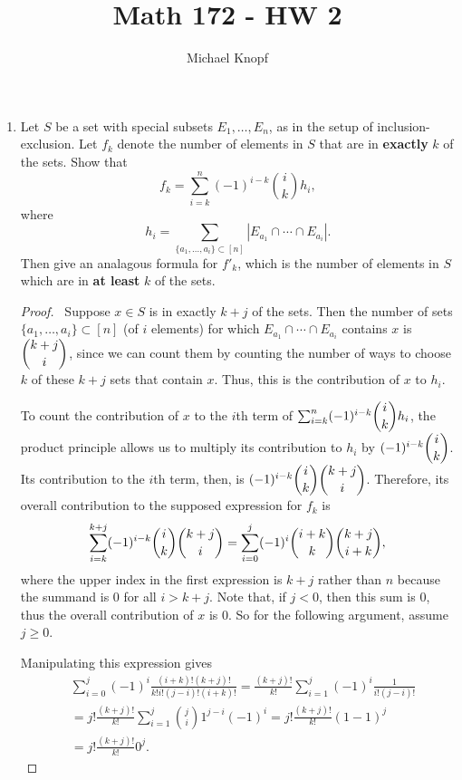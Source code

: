 \documentclass[12pt]{article}
\begin{document}
 


\title{Math 172 - HW 2}
\author{Michael Knopf}
 
\maketitle


\begin{enumerate}[leftmargin=0cm,itemindent=.5cm,labelwidth=\itemindent,labelsep=0cm,align=left]
\item Let $S$ be a set with special subsets $E_1, \dots , E_n$, as in the setup of inclusion-exclusion.  Let $f_k$ denote the number of elements in $S$ that are in \textbf{exactly} $k$ of the sets.  Show that $$f_k = \sum_{i=k}^n (-1)^{i-k} \binom{i}{k} h_i,$$ where $$h_i = \sum_{\{a_1, \dots , a_i \} \subset [n]} |E_{a_1} \cap \cdots \cap E_{a_i}|.$$  Then give an analagous formula for $f'_k$, which is the number of elements in $S$ which are in \textbf{at least} $k$ of the sets.

\begin{proof}

\ Suppose $x \in S$ is in exactly $k+j$ of the sets.  Then the number of sets $\{a_1, \dots, a_i\} \subset [n]$ (of $i$ elements) for which $E_{a_1} \cap \cdots \cap E_{a_i}$ contains $x$ is $\dbinom{k+j}{i}$, since we can count them by counting the number of ways to choose $k$ of these $k+j$ sets that contain $x$.  Thus, this is the contribution of $x$ to $h_i$.

To count the contribution of $x$ to the $i$th term of $\sum_{i=k}^n (-1)^{i-k} \dbinom{i}{k} h_i$, the product principle allows us to multiply its contribution to $h_i$ by $(-1)^{i-k}\dbinom{i}{k}$.  Its contribution to the $i$th term, then, is $(-1)^{i-k}\dbinom{i}{k}\dbinom{k+j}{i}$.  Therefore, its overall contribution to the supposed expression for $f_k$ is $$\sum_{i=k}^{k+j} (-1)^{i-k}\dbinom{i}{k}\dbinom{k+j}{i} = \sum_{i=0}^{j} (-1)^{i}\dbinom{i+k}{k}\dbinom{k+j}{i+k},$$ where the upper index in the first expression is $k+j$ rather than $n$ because the summand is $0$ for all $i > k+j$.  Note that, if $j < 0$, then this sum is 0, thus the overall contribution of $x$ is $0$.  So for the following argument, assume $j \geq 0$.

Manipulating this expression gives
\begin{align*}
& \sum_{i=0}^j (-1)^i \frac{(i+k)!(k+j)!}{k!i!(j-i)!(i+k)!} = \frac{(k+j)!}{k!} \sum_{i=1}^j (-1)^i \frac{1}{i!(j-i)!} \\
&=j! \frac{(k+j)!}{k!} \sum_{i=1}^j \binom{j}{i}1^{j-i}(-1)^i = j! \frac{(k+j)!}{k!} (1-1)^j \\
&= j! \frac{(k+j)!}{k!} 0^j.
\end{align*}


\end{proof}
\end{enumerate}
\end{document}
